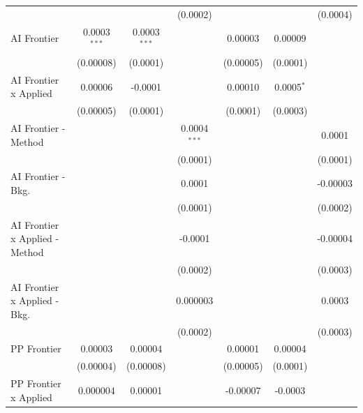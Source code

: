 \begin{tabular}{lcccccc}
                                  &                 &                 & (0.0002)        &               &              & (0.0004)\\   
   AI Frontier                    & 0.0003$^{***}$  & 0.0003$^{***}$  &                 & 0.00003       & 0.00009      &   \\   
                                  & (0.00008)       & (0.0001)        &                 & (0.00005)     & (0.0001)     &   \\   
   AI Frontier x Applied          & 0.00006         & -0.0001         &                 & 0.00010       & 0.0005$^{*}$ &   \\   
                                  & (0.00005)       & (0.0001)        &                 & (0.0001)      & (0.0003)     &   \\   
   AI Frontier - Method           &                 &                 & 0.0004$^{***}$  &               &              & 0.0001\\   
                                  &                 &                 & (0.0001)        &               &              & (0.0001)\\   
   AI Frontier - Bkg.             &                 &                 & 0.0001          &               &              & -0.00003\\   
                                  &                 &                 & (0.0001)        &               &              & (0.0002)\\   
   AI Frontier x Applied - Method &                 &                 & -0.0001         &               &              & -0.00004\\   
                                  &                 &                 & (0.0002)        &               &              & (0.0003)\\   
   AI Frontier x Applied - Bkg.   &                 &                 & 0.000003        &               &              & 0.0003\\   
                                  &                 &                 & (0.0002)        &               &              & (0.0003)\\   
   PP Frontier                    & 0.00003         & 0.00004         &                 & 0.00001       & 0.00004      &   \\   
                                  & (0.00004)       & (0.00008)       &                 & (0.00005)     & (0.0001)     &   \\   
   PP Frontier x Applied          & 0.000004        & 0.00001         &                 & -0.00007      & -0.0003      &   \\   

\end{tabular}
